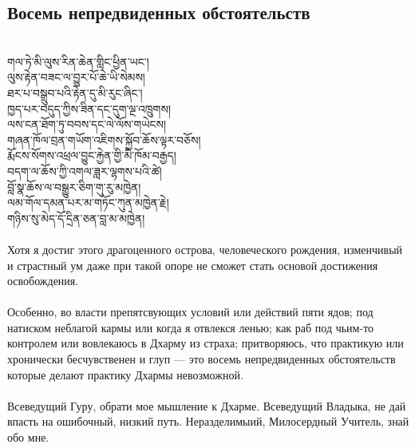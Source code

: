 \subsection*{Восемь непредвиденных обстоятельств}
\\
\ti
གལ་ཏེ་མི་ལུས་རིན་ཆེན་གླིང་ཕྱིན་ཡང༌།\\
ལུས་རྟེན་བཟང་ལ་བྱུར་པོ་ཆེ་ཡི་སེམས། \\
ཐར་པ་བསྒྲུབ་པའི་རྟེན་དུ་མི་རུང་ཞིང༌། \\
ཁྱད་པར་བདུད་ཀྱིས་ཟིན་དང་དུག་ལྔ་འཁྲུགས། \\
ལས་ངན་ཐོག་ཏུ་བབས་དང་ལེ་ལོས་གཡེངས། \\
གཞན་ཁོལ་བྲན་གཡོག་འཇིགས་སྐྱོབ་ཆོས་ལྟར་བཅོས། \\
རྨོངས་སོགས་འཕྲལ་བྱུང་རྐྱེན་གྱི་མི་ཁོམ་བརྒྱད། \\
བདག་ལ་ཆོས་ཀྱི་འགལ་ཟླར་ལྷགས་པའི་ཚེ། \\
བློ་སྣ་ཆོས་ལ་བསྒྱུར་ཅིག་གུ་རུ་མཁྱེན། \\
ལམ་གོལ་དམན་པར་མ་གཏོང་ཀུན་མཁྱེན་རྗེ། \\
གཉིས་སུ་མེད་དོ་དྲིན་ཅན་བླ་མ་མཁྱེན། \\
\\
\ru
\noindent
Хотя я достиг этого драгоценного острова, человеческого рождения,
изменчивый и страстный ум даже при такой опоре
не сможет стать основой достижения освобождения.\\
\\
Особенно, во власти препятсвующих условий или действий пяти ядов;
под натиском неблагой кармы или когда я отвлекся ленью;
как раб под чьим-то контролем или вовлекаюсь в Дхарму из страха;
притворяюсь, что практикую или хронически бесчув\-ственен и глуп
— это восемь непредвиденных обстоя\-тельств которые
делают практику Дхармы невозможной.\\
\\
Всеведущий Гуру, обрати мое мышление к Дхарме.
Всеведущий Владыка, не дай впасть на ошибочный, низкий путь.
Нераздели\-мыий, Милосердный Учитель, знай обо мне.

\newpage
